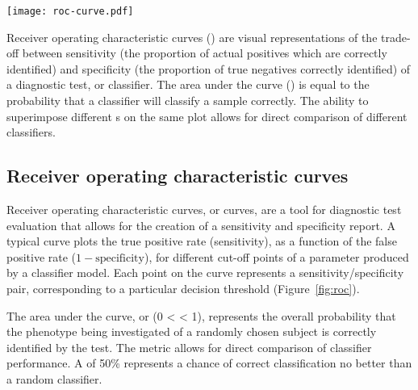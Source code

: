 \begin{marginfigure}%
    \texttt{[image: roc-curve.pdf]}
    \caption[Example of a receiver operating characteristic (
    curve)]{Receiver operating characteristic curves () are
      visual representations of the trade-off between sensitivity (the
      proportion of actual positives which are correctly identified) and
      specificity (the proportion of true negatives correctly identified) of a
      diagnostic test, or classifier.  The area under the  curve
      () is equal to the probability that a classifier will
      classify a sample correctly.  The ability to superimpose different
      s on the same plot allows for direct comparison of
      different classifiers.}
    \label{fig:roc}%
\end{marginfigure}

\subsection{Receiver operating characteristic curves}
\label{sec:methods-roc}

Receiver operating characteristic curves, or  curves, are a tool
for diagnostic test evaluation that allows for the creation of a sensitivity and
specificity report.\cite{fawcett_introduction_2006} A typical 
curve plots the true positive rate (sensitivity), as a function of the false
positive rate ($1-\text{specificity}$), for different cut-off points of a
parameter produced by a classifier model.  Each point on the
 curve represents a sensitivity/specificity pair, corresponding
to a particular decision threshold (Figure~\ref{fig:roc}).

The area under the curve, or  (0 <  < 1),
represents the overall probability that the phenotype being investigated of a
randomly chosen subject is correctly identified by the
test.\cite{hanley_meaning_1982}  The  metric allows for direct
comparison of classifier performance.  A  of 50\% represents a
chance of correct classification no better than a random classifier.


